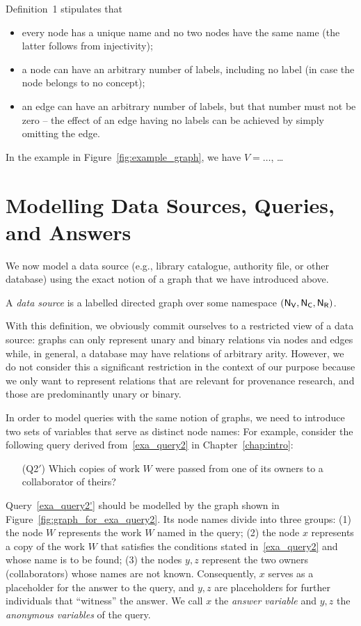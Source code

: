 %
Definition~1 stipulates that
%
\begin{itemize}
  \item
    every node has a unique name and no two nodes have the same name (the latter follows from injectivity);
  \item
    a node can have an arbitrary number of labels, including no label (in case the node belongs to no concept);
  \item
    an edge can have an arbitrary number of labels, but that number must not be zero --
    the effect of an edge having no labels can be achieved by simply omitting the edge.
\end{itemize}

In the example in Figure~\ref{fig:example_graph},
we have $V = \dots$, \dots{}

\section{Modelling Data Sources, Queries, and Answers}

We now model a data source (e.g., library catalogue, authority file, or other database)
using the exact notion of a graph that we have introduced above.
%
\begin{definition}
  A \emph{data source} is a labelled directed graph
  over some namespace $(\mathsf{N}_\mathsf{V},\mathsf{N}_\mathsf{C},\mathsf{N}_\mathsf{R})$.
\end{definition}
%
With this definition, we obviously commit ourselves to a restricted view of a data source:
graphs can only represent unary and binary relations via nodes and edges
while, in general, a database may have relations of arbitrary arity.
However, we do not consider this a significant restriction in the context of our purpose
because we only want to represent relations that are relevant for provenance research,
and those are predominantly unary or binary. 

In order to model queries with the same notion of graphs, we need to introduce
two sets of variables that serve as distinct node names:
For example, consider the following query derived from~\ref{exa_query2} in Chapter~\ref{chap:intro}:
%
\begin{enumerate}
  \item[(Q2$'$)]
    \label{exa_query2'}
    Which copies of work $W$ were passed from one of its owners to a collaborator of theirs?
\end{enumerate}
%
Query~\ref{exa_query2'}
should be modelled by the graph shown in Figure~\ref{fig:graph_for_exa_query2}.
Its node names divide into three groups:
(1) the node $W$ represents the work $W$ named in the query;
(2) the node $x$ represents a copy of the work $W$ that satisfies the conditions stated in~\ref{exa_query2} and
whose name is to be found;
(3) the nodes $y,z$ represent the two owners (collaborators) whose names are not known.
Consequently, $x$ serves as a placeholder for the answer to the query,
and $y,z$ are placeholders for further individuals that ``witness'' the answer.
We call $x$ the \emph{answer variable} and $y,z$ the \emph{anonymous variables}
of the query.

